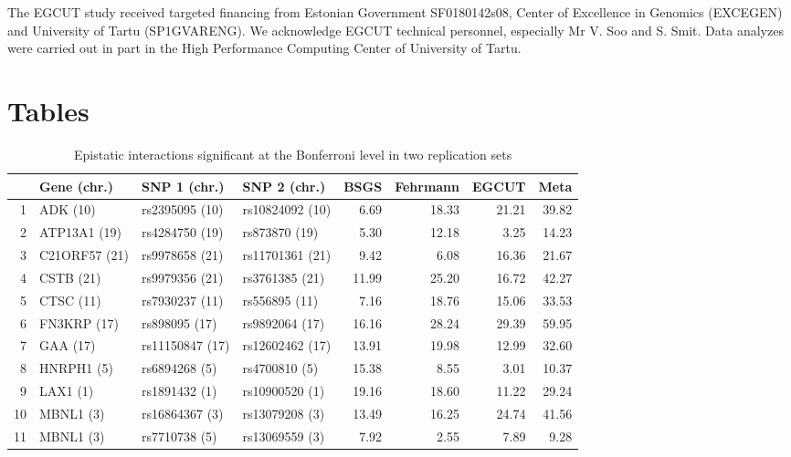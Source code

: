 \documentclass{article}
\begin{document}
The EGCUT study received targeted financing from Estonian Government SF0180142s08, Center of Excellence in Genomics (EXCEGEN) and University of Tartu (SP1GVARENG). We acknowledge EGCUT technical personnel, especially Mr V. Soo and S. Smit. Data analyzes were carried out in part in the High Performance Computing Center of University of Tartu.




\clearpage
\section*{Tables}

\begin{table}[ht]
	\centering
	\begin{threeparttable}
		\caption{Epistatic interactions significant at the Bonferroni level in two replication sets}
		\label{tab:bonferroni}
		{\footnotesize
		\begin{tabular}{rlllrrrr}
  \hline
 & Gene (chr.) & SNP 1 (chr.) & SNP 2 (chr.) & BSGS\tnote{2} & Fehrmann\tnote{3} & EGCUT\tnote{3} & Meta\tnote{4} \\
  \hline
1 & ADK (10)  & rs2395095 (10)  & rs10824092 (10)  & 6.69\tnote{1} & 18.33\tnote{1} & 21.21\tnote{1} & 39.82\tnote{1} \\
  2 & ATP13A1 (19)  & rs4284750 (19)  & rs873870 (19)  & 5.30 & 12.18 & 3.25 & 14.23 \\
  3 & C21ORF57 (21)  & rs9978658 (21)  & rs11701361 (21)  & 9.42 & 6.08 & 16.36 & 21.67 \\
  4 & CSTB (21)  & rs9979356 (21)  & rs3761385 (21)  & 11.99 & 25.20 & 16.72 & 42.27 \\
  5 & CTSC (11)  & rs7930237 (11)  & rs556895 (11)  & 7.16 & 18.76 & 15.06 & 33.53 \\
  6 & FN3KRP (17)  & rs898095 (17)  & rs9892064 (17)  & 16.16 & 28.24 & 29.39 & 59.95 \\
  7 & GAA (17)  & rs11150847 (17)  & rs12602462 (17)  & 13.91 & 19.98 & 12.99 & 32.60 \\
  8 & HNRPH1 (5)  & rs6894268 (5)  & rs4700810 (5)  & 15.38 & 8.55 & 3.01 & 10.37 \\
  9 & LAX1 (1)  & rs1891432 (1)  & rs10900520 (1)  & 19.16 & 18.60 & 11.22 & 29.24 \\
  10 & MBNL1 (3)  & rs16864367 (3)  & rs13079208 (3)  & 13.49 & 16.25 & 24.74 & 41.56 \\
  11 & MBNL1 (3)  & rs7710738 (5)  & rs13069559 (3)  & 7.92 & 2.55 & 7.89 & 9.28 \\

\end{tabular}}
\end{threeparttable}
\end{table}
\end{document}
